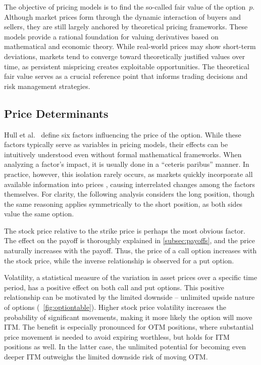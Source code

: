 \documentclass[english,12pt,a4paper,pdftex,sci,utf8]{aaltothesis}
\begin{document}
The objective of pricing models is to find the so-called fair value of the option~$p$. Although market prices form through the dynamic interaction of buyers and sellers, they are still largely anchored by theoretical pricing frameworks. These models provide a rational foundation for valuing derivatives based on mathematical and economic theory. While real-world prices may show short-term deviations, markets tend to converge toward theoretically justified values over time, as persistent mispricing creates exploitable opportunities. The theoretical fair value serves as a crucial reference point that informs trading decisions and risk management strategies.

\subsection{Price Determinants}

Hull et al.\ \cite{hull2013fundamentals} define six factors influencing the price of the option. While these factors typically serve as variables in pricing models, their effects can be intuitively understood even without formal mathematical frameworks. When analyzing a factor's impact, it is usually done in a ``ceteris paribus'' manner. In practice, however, this isolation rarely occurs, as markets quickly incorporate all available information into prices \cite{fama1970efficient}, causing interrelated changes among the factors themselves. For clarity, the following analysis considers the long position, though the same reasoning applies symmetrically to the short position, as both sides value the same option.

The stock price relative to the strike price is perhaps the most obvious factor. The effect on the payoff is thoroughly explained in \cref{subsec:payoffs}, and the price naturally increases with the payoff. Thus, the price of a call option increases with the stock price, while the inverse relationship is observed for a put option.

Volatility, a statistical measure of the variation in asset prices over a specific time period, has a positive effect on both call and put options. This positive relationship can be motivated by the limited downside -- unlimited upside nature of options (~\ref{fig:optiontable}). Higher stock price volatility increases the probability of significant movements, making it more likely the option will move ITM. The benefit is especially pronounced for OTM positions, where substantial price movement is needed to avoid expiring worthless, but holds for ITM positions as well. In the latter case, the unlimited potential for becoming even deeper ITM outweighs the limited downside risk of moving OTM.
\end{document}
